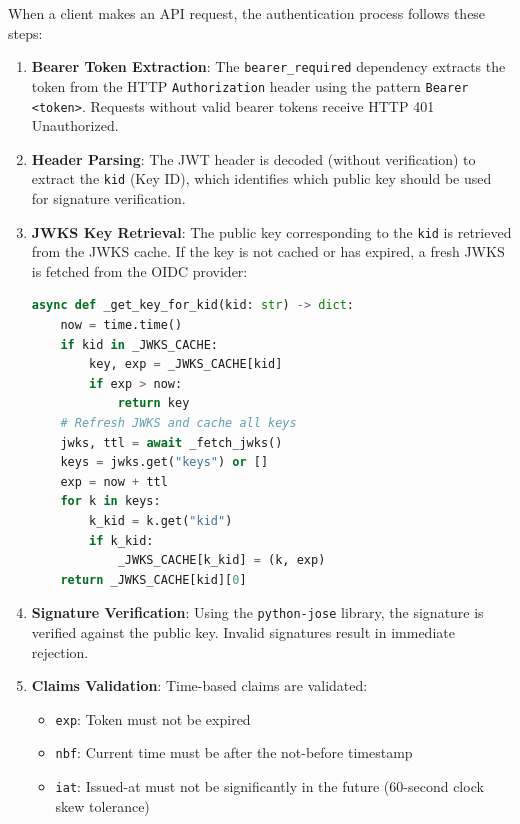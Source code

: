When a client makes an API request, the authentication process follows these steps:

\begin{enumerate}
    \item \textbf{Bearer Token Extraction}: The \texttt{bearer\_required} dependency extracts the token from the HTTP \texttt{Authorization} header using the pattern \texttt{Bearer <token>}. Requests without valid bearer tokens receive HTTP 401 Unauthorized.
    
    \item \textbf{Header Parsing}: The JWT header is decoded (without verification) to extract the \texttt{kid} (Key ID), which identifies which public key should be used for signature verification.
    
    \item \textbf{JWKS Key Retrieval}: The public key corresponding to the \texttt{kid} is retrieved from the JWKS cache. If the key is not cached or has expired, a fresh JWKS is fetched from the OIDC provider:
    
\begin{lstlisting}[language=Python,caption={JWKS key retrieval with caching}]
async def _get_key_for_kid(kid: str) -> dict:
    now = time.time()
    if kid in _JWKS_CACHE:
        key, exp = _JWKS_CACHE[kid]
        if exp > now:
            return key
    # Refresh JWKS and cache all keys
    jwks, ttl = await _fetch_jwks()
    keys = jwks.get("keys") or []
    exp = now + ttl
    for k in keys:
        k_kid = k.get("kid")
        if k_kid:
            _JWKS_CACHE[k_kid] = (k, exp)
    return _JWKS_CACHE[kid][0]
\end{lstlisting}
    
    \item \textbf{Signature Verification}: Using the \texttt{python-jose} library, the signature is verified against the public key. Invalid signatures result in immediate rejection.
    
    \item \textbf{Claims Validation}: Time-based claims are validated:
    \begin{itemize}
        \item \texttt{exp}: Token must not be expired
        \item \texttt{nbf}: Current time must be after the not-before timestamp
        \item \texttt{iat}: Issued-at must not be significantly in the future (60-second clock skew tolerance)
    \end{itemize}
    

\end{enumerate}
